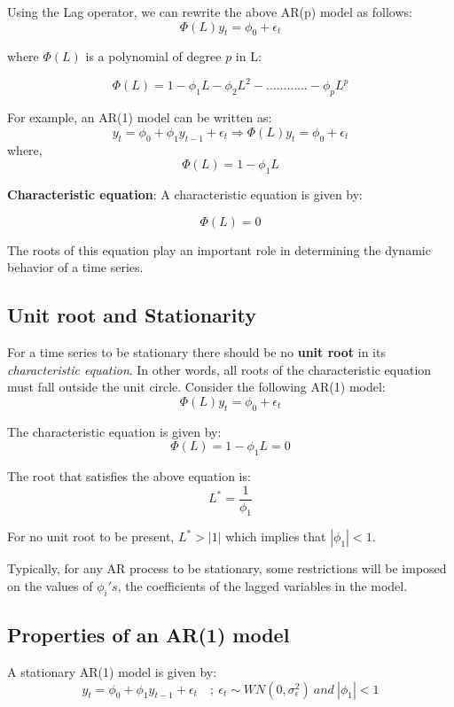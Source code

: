 \documentclass[]{book}
\theoremstyle{definition}
\theoremstyle{definition}
\theoremstyle{definition}
\theoremstyle{remark}
\begin{document}
Using the Lag operator, we can rewrite the above AR(p) model as follows:
\[ \Phi(L)y_t=\phi_0+\epsilon_t \]

where \(\displaystyle \Phi(L)\) is a polynomial of degree \(p\) in L:

\[ \Phi(L) = 1-\phi_1 L - \phi_2 L^2- \ldots\ldots\ldots\ldots -\phi_p L^p\]

For example, an AR(1) model can be written as:
\[y_t=\phi_0+\phi_1 y_{t-1} + \epsilon_t \Rightarrow  \Phi(L)y_t=\phi_0+\epsilon_t\]
where, \[ \Phi(L) = 1-\phi_1 L \]

\textbf{Characteristic equation}: A characteristic equation is given by:

\[\Phi(L)=0\]

The roots of this equation play an important role in determining the
dynamic behavior of a time series.

\hypertarget{unit-root-and-stationarity}{%
\subsection{Unit root and
Stationarity}\label{unit-root-and-stationarity}}

For a time series to be stationary there should be no \textbf{unit root}
in its \emph{characteristic equation}. In other words, all roots of the
characteristic equation must fall outside the unit circle. Consider the
following AR(1) model: \[\Phi(L)y_t = \phi_0 + \epsilon_t\]

The characteristic equation is given by: \[\Phi(L)=1-\phi_1L=0 \]

The root that satisfies the above equation is: \[ L^*=\frac{1}{\phi_1}\]

For no unit root to be present, \(L^*>|1|\) which implies that
\(|\phi_1|<1\).

Typically, for any AR process to be stationary, some restrictions will
be imposed on the values of \(\phi_i's\), the coefficients of the lagged
variables in the model.

\hypertarget{properties-of-an-ar1-model}{%
\subsection{Properties of an AR(1)
model}\label{properties-of-an-ar1-model}}

A stationary AR(1) model is given by:
\[ y_t=\phi_0 +\phi_1 y_{t-1}+ \epsilon_t \quad ; \ \epsilon_t\sim WN(0, \sigma_\epsilon^2) \ and \  |\phi_1|<1\]
\end{document}
